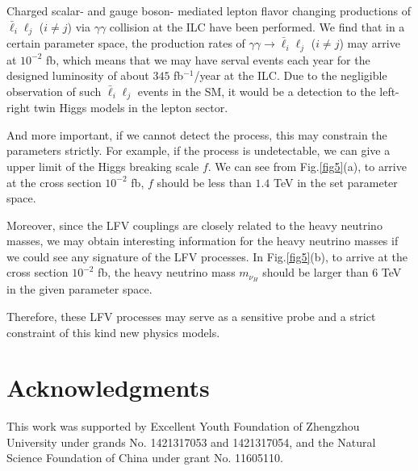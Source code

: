 \documentclass[preprint,aps,12pt,showpacs,nofootinbib,tightenlines]{revtex4}
\begin{document}
Charged scalar- and gauge boson- mediated lepton flavor changing productions
of $\bar \ell_i \ell_j$ ($i\neq j$)  via $\gamma \gamma$ collision at
the ILC have been performed. We find that in a certain parameter space,
the production rates of $\gamma \gamma \to \bar \ell_i \ell_j$ ($i\neq j$) may
arrive at $10^{-2}$ fb, which means that we may have serval events each year for
the designed luminosity of about $345$ fb$^{-1}$/year at the ILC.
Due to the negligible observation of such $\bar \ell_i \ell_j$ events
in the SM, it would be a detection to the left-right twin Higgs models in
the lepton sector.

And more important, if we cannot detect the process, this may constrain the
parameters strictly. For example, if the process is undetectable, we can give a upper limit of the
Higgs breaking scale $f$. We can see from Fig.\ref{fig5}(a), to arrive at the cross section $10^{-2}$ fb, $f$
should be less than $1.4$ TeV in the set parameter space.

Moreover, since the LFV couplings are closely related to the heavy neutrino masses, we may obtain
interesting information for the heavy neutrino masses if we could see any signature of the LFV processes.
In Fig.\ref{fig5}(b), to arrive at the cross section $10^{-2}$ fb, the heavy neutrino mass $m_{\nu_H}$
should be larger than $6$ TeV in the given parameter space.

Therefore, these LFV processes may serve as a sensitive probe and
 a strict constraint of this kind new physics models.






\section{Acknowledgments}  %
This work was supported by Excellent Youth Foundation of Zhengzhou University under grands No. 1421317053
and 1421317054, and the Natural Science Foundation of China under grant No. 11605110.

\hspace{1mm}
\end{document}
